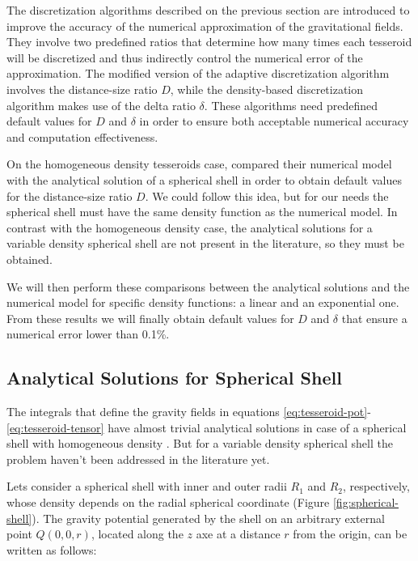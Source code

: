 \documentclass[extra]{gji}
\begin{document}
The discretization algorithms described on the previous section are
introduced to improve the accuracy of the numerical approximation of
the gravitational fields.
They involve two predefined ratios that determine how many
times each tesseroid will be discretized and thus indirectly control
the numerical error of the approximation.
The modified version of the adaptive discretization algorithm involves
the distance-size ratio $D$, while the density-based discretization
algorithm makes use of the delta ratio $\delta$.
These algorithms need predefined default values for $D$ and $\delta$
in order to ensure both acceptable numerical accuracy and computation
effectiveness.

On the homogeneous density tesseroids case, \citet{Uieda2016} compared
their numerical model with the analytical solution of a spherical
shell in order to obtain default values for the distance-size ratio
$D$.
We could follow this idea, but for our needs the spherical shell must
have the same density function as the numerical model.
In contrast with the homogeneous density case, the analytical solutions
for a variable density spherical shell are not present in the
literature, so they must be obtained.

We will then perform these comparisons between the analytical solutions
and the numerical model for specific density functions: a linear and an
exponential one.
From these results we will finally obtain default values for $D$
and $\delta$ that ensure a numerical error lower than 0.1\%.


\subsection{Analytical Solutions for Spherical Shell}

The integrals that define the gravity fields in equations
\ref{eq:tesseroid-pot}-\ref{eq:tesseroid-tensor} have almost trivial
analytical solutions in case of a spherical shell with homogeneous
density \citep{Mikuska2006,Grombein2013}.
But for a variable density spherical shell the problem haven't been
addressed in the literature yet.

Lets consider a spherical shell with inner and outer radii $R_1$ and
$R_2$, respectively, whose density depends on the radial spherical
coordinate (Figure \ref{fig:spherical-shell}).
The gravity potential generated by the shell on an arbitrary external
point $Q(0,0,r)$, located along the $z$ axe at a distance $r$ from the
origin, can be written as follows:
\end{document}

